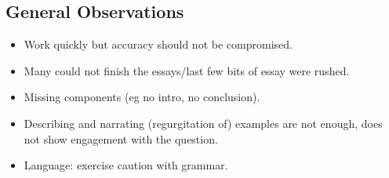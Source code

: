 \documentclass[../main.tex]{subfiles}
\begin{document}
        \subsection*{General Observations}
        \begin{itemize}
            \item Work quickly but accuracy should not be compromised.
            \item Many could not finish the essays/last few bits of essay were rushed.
            \item Missing components (eg no intro, no conclusion).
            \item Describing and narrating (regurgitation of) examples are not enough, does not show engagement with the question.
            \item Language: exercise caution with grammar.
        \end{itemize}
\end{document}
